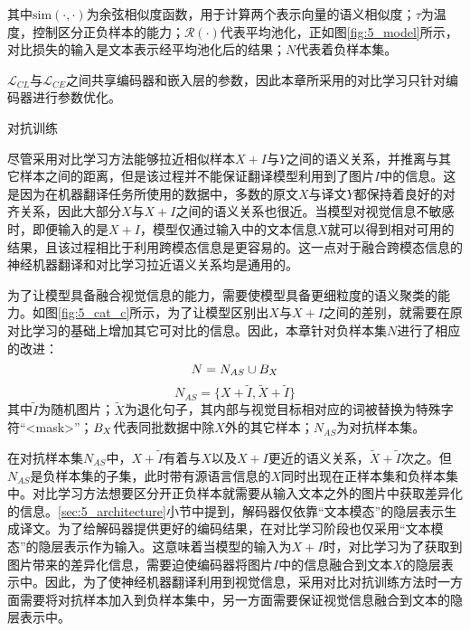 其中$\mathrm{sim}(\cdot,\cdot)$为余弦相似度函数，用于计算两个表示向量的语义相似度；$\tau$为温度，控制区分正负样本的能力；$\mathcal{R}(\cdot)$代表平均池化，正如图\ref{fig:5_model}所示，对比损失的输入是文本表示经平均池化后的结果；$N$代表着负样本集。

$\mathcal{L}_{CL}$与$\mathcal{L}_{CE}$之间共享编码器和嵌入层的参数，因此本章所采用的对比学习只针对编码器进行参数优化。

{\sffamily 对抗训练}

尽管采用对比学习方法能够拉近相似样本$X+I$与$Y$之间的语义关系，并推离与其它样本之间的距离，但是该过程并不能保证翻译模型利用到了图片$I$中的信息。这是因为在机器翻译任务所使用的数据中，多数的原文$X$与译文$Y$都保持着良好的对齐关系，因此大部分$X$与$X+I$之间的语义关系也很近。当模型对视觉信息不敏感时，即便输入的是$X+I$，模型仅通过输入中的文本信息$X$就可以得到相对可用的结果，且该过程相比于利用跨模态信息是更容易的。这一点对于融合跨模态信息的神经机器翻译和对比学习拉近语义关系均是通用的。

为了让模型具备融合视觉信息的能力，需要使模型具备更细粒度的语义聚类的能力。如图\ref{fig:5_cat_c}所示，为了让模型区别出$X$与$X+I$之间的差别，就需要在原对比学习的基础上增加其它可对比的信息。因此，本章针对负样本集$N$进行了相应的改进：
\begin{equation}
    N=N_{AS}\cup B_{\\X}
    \label{eq:5_negative_sample_set}
\end{equation}
\begin{equation}
    N_{AS}=\{X+\tilde{I},\tilde{X}+\tilde{I}\}
    \label{eq:5_adversarial_sample_set}
\end{equation}
其中$\tilde{I}$为随机图片；$\tilde{X}$为退化句子，其内部与视觉目标相对应的词被替换为特殊字符“<mask>”；$B_{\\X}$代表同批数据中除$X$外的其它样本；$N_{AS}$为对抗样本集。

在对抗样本集$N_{AS}$中，$X+\tilde{I}$有着与$X$以及$X+I$更近的语义关系，$\tilde{X}+\tilde{I}$次之。但$N_{AS}$是负样本集的子集，此时带有源语言信息的$X$同时出现在正样本集和负样本集中。对比学习方法想要区分开正负样本就需要从输入文本之外的图片中获取差异化的信息。\ref{sec:5_architecture}小节中提到，解码器仅依靠“文本模态”的隐层表示生成译文。为了给解码器提供更好的编码结果，在对比学习阶段也仅采用“文本模态”的隐层表示作为输入。这意味着当模型的输入为$X+I$时，对比学习为了获取到图片带来的差异化信息，需要迫使编码器将图片$I$中的信息融合到文本$X$的隐层表示中。因此，为了使神经机器翻译利用到视觉信息，采用对比对抗训练方法时一方面需要将对抗样本加入到负样本集中，另一方面需要保证视觉信息融合到文本的隐层表示中。

